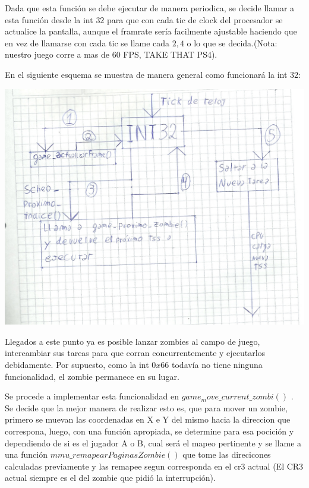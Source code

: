 \documentclass[a4paper]{article}
\begin{document}
Dada que esta función se debe ejecutar de manera periodica, se decide llamar a esta función desde la int $32$ para que con cada tic de clock del procesador se actualice la pantalla, aunque el framrate sería facilmente ajustable haciendo que en vez de llamarse con cada tic se llame cada $2, 4$ o lo que se decida.(Nota: nuestro juego corre a mas de 60 FPS, TAKE THAT PS4).

En el siguiente esquema se muestra de manera general como funcionará la int $32$:


\includegraphics[scale=0.9]{dibujos/dibujo2.jpg}\\
\newpage


Llegados a este punto ya es posible lanzar zombies al campo de juego, intercambiar sus tareas para que corran concurrentemente y ejecutarlos debidamente. Por supuesto, como la int $0x66$ todavía no tiene ninguna funcionalidad, el zombie permanece en su lugar.

Se procede a implementar esta funcionalidad en $game_move\_current\_zombi()$ . Se decide que la mejor manera de realizar esto es, que para mover un zombie, primero se muevan las coordenadas en X e Y del mismo hacia la direccion que correspona, luego, con una función apropiada, se determine para esa pocición y dependiendo de si es el jugador A o B, cual será el mapeo pertinente y se llame a una función $mmu\_remapearPaginasZombie()$ que tome las direcicones calculadas previamente y las remapee segun corresponda en el cr3 actual (El CR3 actual siempre es el del zombie que pidió la interrupción).
\end{document}
